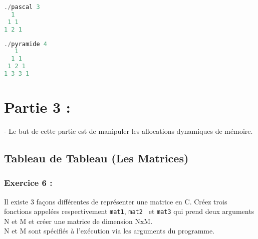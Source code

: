\documentclass[a4paper]{article}
\begin{document}
	\begin{lstlisting}[language=C]
./pascal 3
  1
 1 1
1 2 1
	\end{lstlisting}
	\begin{lstlisting}[language=C]	
./pyramide 4
   1
  1 1
 1 2 1
1 3 3 1
	\end{lstlisting}

	\section*{Partie 3 : }
	- Le but de cette partie est de manipuler les allocations dynamiques de mémoire.
	\subsection*{Tableau de Tableau (Les Matrices)}
	\subsubsection*{Exercice 6 : }
	Il existe 3 façons différentes de représenter une matrice en C. Créez trois fonctions appelées respectivement \texttt{mat1}, \texttt{mat2 } et \texttt{mat3} qui prend deux arguments N et M et créer une matrice de dimension NxM. \\
	N et M sont spécifiés à l'exécution via les arguments du programme.
\end{document}
